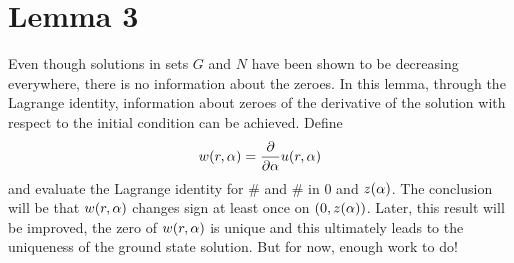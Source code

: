\section{Lemma 3}
Even though solutions in sets $G$ and $N$ have been shown to be decreasing everywhere, there is no information about the zeroes. In this lemma, through the Lagrange identity, information about zeroes of the derivative of the solution with respect to the initial condition can be achieved. Define $$w(r,\alpha) = \frac{\partial}{\partial\alpha} u(r,\alpha)$$ and evaluate the Lagrange identity for \# and \# in $0$ and $z(\alpha)$. The conclusion will be that $w(r,\alpha)$ changes sign at least once on $(0,z(\alpha))$. Later, this result will be improved, the zero of $w(r,\alpha)$ is unique and this ultimately leads to the uniqueness of the ground state solution. But for now, enough work to do!

